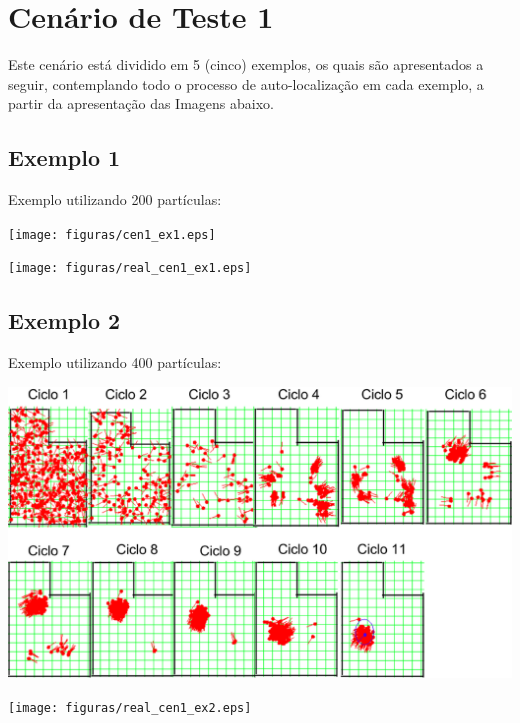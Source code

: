 \section{Cenário de Teste 1}

Este cenário está dividido em 5 (cinco) exemplos, os quais são apresentados a seguir, contemplando todo o processo de auto-localização
em cada exemplo, a partir da apresentação das Imagens abaixo.

\subsection{Exemplo 1}

Exemplo utilizando 200 partículas:

{\centering
\texttt{[image: figuras/cen1\_ex1.eps]}
\label{img:cen1_ex1}
\par}

{\centering
\texttt{[image: figuras/real\_cen1\_ex1.eps]}
\label{img:real_cen1_ex1}
\par}

\subsection{Exemplo 2}

Exemplo utilizando 400 partículas:

{\centering
\includegraphics[scale=0.4]{figuras/cen1_ex2.eps}
\label{img:cen1_ex2}
\par}

{\centering
\texttt{[image: figuras/real\_cen1\_ex2.eps]}
\label{img:real_cen1_ex2}
\par}

